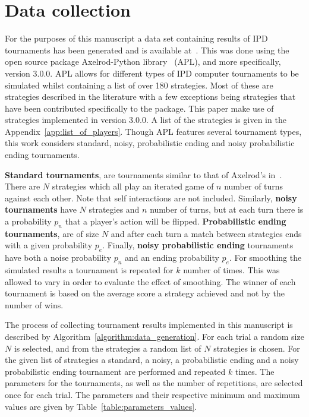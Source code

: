 \documentclass{article}
\newcommand{\numberofstrategies}{}
\begin{document}
\section{Data collection}\label{section:data_collection}

For the purposes of this manuscript a data set containing results of IPD
tournaments has been generated and is available at~\cite{data}. This was done using the
open source package Axelrod-Python library~\cite{axelrodproject} (APL), and more specifically,
version 3.0.0. APL allows for different types of IPD computer
tournaments to be simulated whilst containing a list of over 180 strategies.
Most of these are strategies described in the literature with a few exceptions
being strategies that have been contributed specifically to the package. This
paper make use of \numberofstrategies strategies implemented in version 3.0.0. A
list of the strategies is given in the Appendix~\ref{app:list_of_players}.
Though APL features several tournament types, this work considers
standard, noisy, probabilistic ending and noisy probabilistic ending
tournaments.

\textbf{Standard tournaments}, are tournaments similar to that of Axelrod's
in~\cite{Axelrod1980a}. There are \(N\) strategies which all play an iterated
game of \(n\) number of turns against each other. Note that self interactions
are not included. Similarly, \textbf{noisy
tournaments} have \(N\) strategies and \(n\) number of turns, but at each turn
there is a probability \(p_n\) that a player's action will be flipped.
\textbf{Probabilistic ending tournaments}, are of size \(N\) and after each turn
a match between strategies ends with a given probability \(p_e\). Finally,
\textbf{noisy probabilistic ending} tournaments have both a noise probability
\(p_n\) and an ending probability \(p_e\). For smoothing the simulated results a
tournament is repeated for \(k\) number of times. This was allowed to vary 
in order to evaluate the effect of smoothing. The winner of each tournament
is based on the average score a strategy achieved and not by the number of wins.

The process of collecting tournament results implemented in this manuscript is described by
Algorithm~\ref{algorithm:data_generation}. For each trial a random size \(N\) is
selected, and from the \numberofstrategies strategies a random list of \(N\) strategies is
chosen. For the given list of strategies a standard, a noisy, a probabilistic
ending and a noisy probabilistic ending tournament are performed and repeated
\(k\) times. The parameters for the tournaments, as well as the number of
repetitions, are selected once for each trial. The parameters and their
respective minimum and maximum values are given by
Table~\ref{table:parameters_values}.
\end{document}
